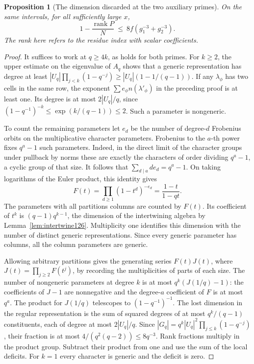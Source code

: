 \documentclass[a4paper,11pt]{article}
\newtheorem{proposition}{Proposition}[section]
\theoremstyle{definition}
\theoremstyle{remark}
\numberwithin{equation}{section}
\begin{document}
\begin{proposition}[The dimension discarded at the two auxiliary primes]
\leavevmode\label{prop:whittakerrank527}
On the same intervals, for all sufficiently large \(x\),
\[
   1-\frac{\operatorname{rank}P}{N}
        \ \le\ 8 f(g_1^{-3}+g_2^{-3}).
\]
The rank here refers to the residue index with scalar coefficients.
\end{proposition}
\begin{proof}
It suffices to work at \(q\ge4k\), as holds for both primes.
For \(k\ge2\), the upper estimate on the eigenvalue of \(A_q\)
shows that a generic representation has degree at least
\(|U_q|\prod_{j<k}(1-q^{-j})\ge |U_q|(1-1/(q-1))\).
If any \(\lambda_\phi\) has two cells in the same row, the exponent
\(\sum e_\phi n(\lambda'_\phi)\) in the preceding proof is at least
one. Its degree is at most \(2|U_q|/q\), since
\((1-q^{-1})^{-k}\le\exp(k/(q-1))\le2\).
Such a parameter is nongeneric.

To count the remaining parameters let \(e_d\) be the number of
degree-\(d\) Frobenius orbits on the multiplicative character
parameters. Frobenius to the \(a\)-th power fixes \(q^a-1\) such
parameters. Indeed, in the direct limit of the character groups
under pullback by norms these are exactly the characters of order
dividing \(q^a-1\), a cyclic group of that size. It follows that
\(\sum_{d\mid a}d e_d=q^a-1\). On taking logarithms of the
Euler product, this identity gives
\[
                    F(t)=\prod_{d\ge1}(1-t^d)^{-e_d}
                              =\frac{1-t}{1-qt}.
\]
The parameters with all partitions columns are counted by \(F(t)\).
Its coefficient of \(t^k\) is \((q-1)q^{k-1}\), the dimension of
the intertwining algebra by Lemma~\ref{lem:intertwine126}. Multiplicity
one identifies this dimension with the number of distinct generic
representations. Since every generic parameter has columns, all
the column parameters are generic.

Allowing arbitrary partitions gives the generating series
\(F(t)J(t)\), where \(J(t)=\prod_{j\ge2}F(t^j)\), by recording
the multiplicities of parts of each size. The number of nongeneric
parameters at degree \(k\) is at most \(q^k(J(1/q)-1)\): the
coefficients of \(J-1\) are nonnegative and the degree-\(a\)
coefficient of \(F\) is at most \(q^a\). The product for \(J(1/q)\)
telescopes to \((1-q^{-1})^{-1}\). The lost dimension in the
regular representation is the sum of squared degrees of at most
\(q^k/(q-1)\) constituents, each of degree at most \(2|U_q|/q\).
Since \(|G_q|=q^k|U_q|^2\prod_{j\le k}(1-q^{-j})\), their
fraction is at most \(4/(q^2(q-2))\le8q^{-3}\). Rank
fractions multiply in the product group. Subtract their product
from one and use the sum of the local deficits. For \(k=1\) every
character is generic and the deficit is zero.
\end{proof}
\end{document}
